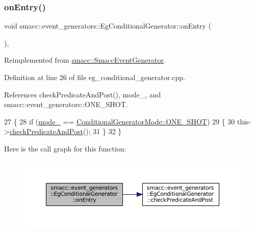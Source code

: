 \subsubsection{\texorpdfstring{on\+Entry()}{onEntry()}}
{\footnotesize\ttfamily void smacc\+::event\+\_\+generators\+::\+Eg\+Conditional\+Generator\+::on\+Entry (\begin{DoxyParamCaption}{ }\end{DoxyParamCaption})\hspace{0.3cm}{\ttfamily [override]}, {\ttfamily [virtual]}}



Reimplemented from \hyperlink{classsmacc_1_1SmaccEventGenerator_aa1eb9cc0fd1b3e83cc87d4871fb0f68a}{smacc\+::\+Smacc\+Event\+Generator}.



Definition at line 26 of file eg\+\_\+conditional\+\_\+generator.\+cpp.



References check\+Predicate\+And\+Post(), mode\+\_\+, and smacc\+::event\+\_\+generators\+::\+O\+N\+E\+\_\+\+S\+H\+OT.


\begin{DoxyCode}
27         \{
28             \textcolor{keywordflow}{if} (\hyperlink{classsmacc_1_1event__generators_1_1EgConditionalGenerator_a5f3e7b602c4d250c54bec0d681d2cb80}{mode\_} == \hyperlink{namespacesmacc_1_1event__generators_a1a57548759d7458f91c299f4fc2c5ea4a5bc2964599423c796ecf0aaecdc5be9d}{ConditionalGeneratorMode::ONE\_SHOT})
29             \{
30                 this->\hyperlink{classsmacc_1_1event__generators_1_1EgConditionalGenerator_a2a7e8a3818ffd1899682be9bbb8ae339}{checkPredicateAndPost}();
31             \}
32         \}
\end{DoxyCode}
Here is the call graph for this function\+:
\nopagebreak
\begin{figure}[H]
\begin{center}
\leavevmode
\includegraphics[width=350pt]{classsmacc_1_1event__generators_1_1EgConditionalGenerator_ae3413453dceeabdf20cba6f1f19fc40c_cgraph}
\end{center}
\end{figure}
\mbox{\label{classsmacc_1_1event__generators_1_1EgConditionalGenerator_a08e70fdc7797e05189357286106d267d}} 
